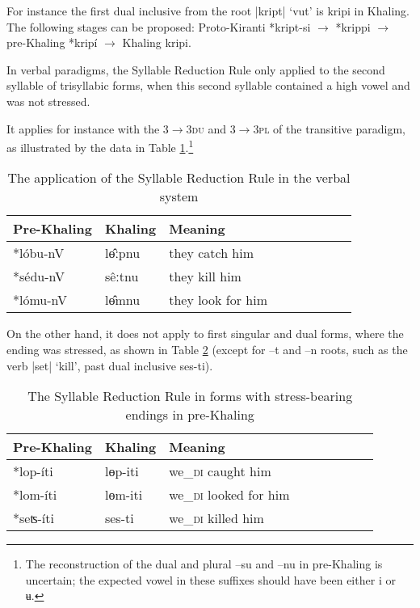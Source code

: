 \documentclass[oldfontcommands,oneside,a4paper,11pt]{article}
\newcommand{\ipa}[1]{{\phon \mbox{#1}}} %
\begin{document}
For instance the first dual inclusive from the root |kript| `vut' is \ipa{kripi} in Khaling. The following stages can be proposed: Proto-Kiranti \ipa{*kript-si} $\rightarrow$ \ipa{*krippi} $\rightarrow$ pre-Khaling \ipa{*kripí}  $\rightarrow$ Khaling \ipa{kripi}.


In  verbal paradigms, the Syllable Reduction Rule only applied to the second syllable of trisyllabic forms, when this second syllable contained a high vowel and was not stressed. 

It applies for instance with the \textsc{3$\rightarrow$3du} and \textsc{3$\rightarrow$3pl} of the transitive paradigm, as illustrated by the data in Table \ref{tab:verbal.drr}.\footnote{The reconstruction of the dual and plural \ipa{--su} and \ipa{--nu} in pre-Khaling is uncertain; the expected vowel in these suffixes should have been either \ipa{i} or \ipa{ʉ}. } 

\begin{table}[H] 
\caption{The application of the  Syllable Reduction Rule in the verbal system} \centering  \label{tab:verbal.drr} 
\begin{tabular}{lllllllll} 
\toprule 
Pre-Khaling	&Khaling &Meaning\\
\midrule
\ipa{*lóbu-nV}  & \ipa{lɵ̂ːpnu} & they catch him \\ 
\ipa{*sédu-nV} & \ipa{sêːtnu} & they kill him \\ 
\ipa{*lómu-nV}  & \ipa{lɵ̂mnu} & they look for him \\
\bottomrule
\end{tabular}
\end{table}

On the other hand, it does not apply to first singular and dual forms, where the ending was stressed, as shown in Table \ref{tab:verbal.du} (except for \ipa{--t} and \ipa{--n} roots, such as the verb |set| `kill', past dual inclusive \ipa{ses-ti}).



\begin{table}[H] 
\caption{The  Syllable Reduction Rule in forms with stress-bearing endings in pre-Khaling} \centering  \label{tab:verbal.du} 
\begin{tabular}{lllllllll} 
\toprule 
Pre-Khaling	&Khaling &Meaning\\
\midrule
\ipa{*lop-íti}  & \ipa{lɵp-iti} & we_{\textsc{di}} caught him \\ 
\ipa{*lom-íti}  & \ipa{lɵm-iti} & we_{\textsc{di}} looked for him \\
\midrule
\ipa{*seʦ-íti} & \ipa{ses-ti} & we_{\textsc{di}} killed him \\ 
\bottomrule
\end{tabular}
\end{table}
\end{document}

